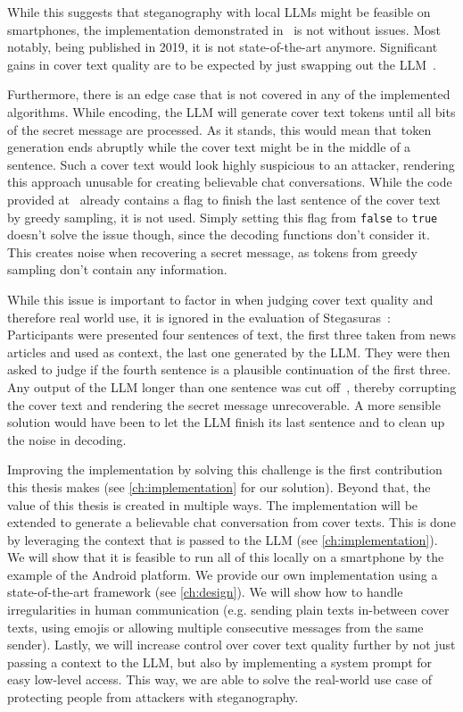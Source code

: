 While this suggests that steganography with local \glspl{LLM} might be feasible on smartphones, the implementation demonstrated in~\cite{zieglerStegasuras2025} is not without issues. Most notably, being published in 2019, it is not state-of-the-art anymore. Significant gains in cover text quality are to be expected by just swapping out the \gls{LLM}~\cite{wuGenerativeTextSteganography2024}.

Furthermore, there is an edge case that is not covered in any of the implemented algorithms. While encoding, the \gls{LLM} will generate cover text tokens until all bits of the secret message are processed. As it stands, this would mean that token generation ends abruptly while the cover text might be in the middle of a sentence. Such a cover text would look highly suspicious to an attacker, rendering this approach unusable for creating believable chat conversations. While the code provided at~\cite{zieglerHarvardnlpNeuralSteganography2025} already contains a flag to finish the last sentence of the cover text by greedy sampling, it is not used. Simply setting this flag from \lstinline|false| to \lstinline|true| doesn't solve the issue though, since the decoding functions don't consider it. This creates noise when recovering a secret message, as tokens from greedy sampling don't contain any information.

While this issue is important to factor in when judging cover text quality and therefore real world use, it is ignored in the evaluation of Stegasuras~\cite{zieglerNeuralLinguisticSteganography2019}: Participants were presented four sentences of text, the first three taken from news articles and used as context, the last one generated by the \gls{LLM}. They were then asked to judge if the fourth sentence is a plausible continuation of the first three. Any output of the \gls{LLM} longer than one sentence was cut off~\cite{zieglerNeuralLinguisticSteganography2019}, thereby corrupting the cover text and rendering the secret message unrecoverable. A more sensible solution would have been to let the \gls{LLM} finish its last sentence and to clean up the noise in decoding.

Improving the implementation by solving this challenge is the first contribution this thesis makes (see \cref{ch:implementation} for our solution). Beyond that, the value of this thesis is created in multiple ways. The implementation will be extended to generate a believable chat conversation from cover texts. This is done by leveraging the context that is passed to the \gls{LLM} (see \cref{ch:implementation}). We will show that it is feasible to run all of this locally on a smartphone by the example of the Android platform. We provide our own implementation using a state-of-the-art framework (see \cref{ch:design}). We will show how to handle irregularities in human communication (e.g. sending plain texts in-between cover texts, using emojis or allowing multiple consecutive messages from the same sender). Lastly, we will increase control over cover text quality further by not just passing a context to the \gls{LLM}, but also by implementing a system prompt for easy low-level access. This way, we are able to solve the real-world use case of protecting people from attackers with steganography.

